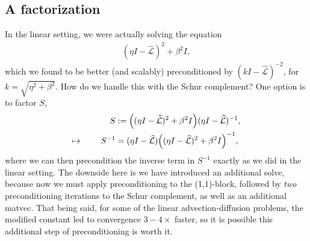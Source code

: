 \documentclass[a4paper,10pt]{article}
\begin{document}
\subsection{A factorization}

In the linear setting, we were actually solving the equation
%
\begin{align*}
(\eta I - \widehat{\mathcal{L}})^2 + \beta^2 I,
\end{align*}
%
which we found to be better (and scalably) preconditioned by $(k I - \widehat{\mathcal{L}})^{-2}$,
for $k = \sqrt{\eta^2+\beta^2}$. How do we handle this with the Schur complement? One
option is to factor $S$,
%
\begin{align*}
S & := \Big((\eta I - \widehat{\mathcal{L}})^2 + \beta^2I\Big)(\eta I - \widehat{\mathcal{L}})^{-1}, \\
\mapsto\hspace{5ex}
S^{-1} & = (\eta I - \widehat{\mathcal{L}})\Big((\eta I - \widehat{\mathcal{L}})^2 + \beta^2I\Big)^{-1},
\end{align*}
%
where we can then precondition the inverse term in $S^{-1}$ exactly as we did in the
linear setting. The downside here is we have introduced an additional solve, because
now we must apply preconditioning to the (1,1)-block, followed by \textit{two}
preconditioning iterations to the Schur complement, as well as an additional matvec.
That being said, for some of the linear advection-diffusion problems, the modified
constant led to convergence $3-4\times$ faster, so it is possible this additional
step of preconditioning is worth it. 
\end{document}
